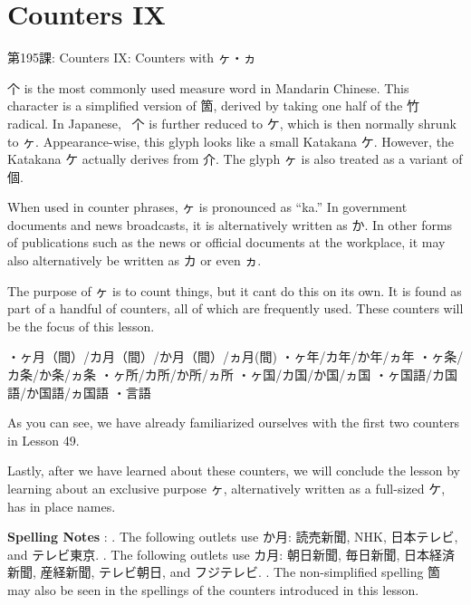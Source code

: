     
\chapter{Counters IX}

\begin{center}
\begin{Large}
第195課: Counters IX: Counters with ヶ・ヵ 
\end{Large}
\end{center}
 
\par{ 个 is the most commonly used measure word in Mandarin Chinese. This character is a simplified version of 箇, derived by taking one half of the 竹 radical. In Japanese,  个 is further reduced to ケ, which is then normally shrunk to ヶ. Appearance-wise, this glyph looks like a small Katakana ケ. However, the Katakana ケ actually derives from 介. The glyph ヶ is also treated as a variant of 個. }

\par{ When used in counter phrases, ヶ is pronounced as “ka.” In government documents and news broadcasts, it is alternatively written as か. In other forms of publications such as the news or official documents at the workplace, it may also alternatively be written as カ or even ヵ. }

\par{ The purpose of ヶ is to count things, but it can\textquotesingle t do this on its own. It is found as part of a handful of counters, all of which are frequently used. These counters will be the focus of this lesson. }

\par{・ヶ月（間）\slash カ月（間）\slash か月（間）\slash ヵ月(間) \hfill\break
・ヶ年\slash カ年\slash か年\slash ヵ年 \hfill\break
・ヶ条\slash カ条\slash か条\slash ヵ条 \hfill\break
・ヶ所\slash カ所\slash か所\slash ヵ所 \hfill\break
・ヶ国\slash カ国\slash か国\slash ヵ国 \hfill\break
・ヶ国語\slash カ国語\slash か国語\slash ヵ国語 \hfill\break
・言語 }

\par{ As you can see, we have already familiarized ourselves with the first two counters in Lesson 49. }

\par{ Lastly, after we have learned about these counters, we will conclude the lesson by learning about an exclusive purpose ヶ, alternatively written as a full-sized ケ, has in place names. }

\par{\textbf{Spelling Notes }: \hfill{}. The following outlets use か月: 読売新聞, NHK, 日本テレビ, and テレビ東京. \hfill{}. The following outlets use カ月: 朝日新聞, 毎日新聞, 日本経済新聞, 産経新聞, テレビ朝日, and フジテレビ. \hfill{}. The non-simplified spelling 箇 may also be seen in the spellings of the counters introduced in this lesson. }

